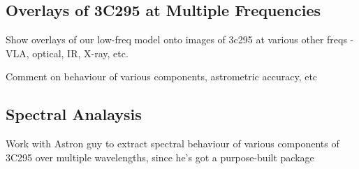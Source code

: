 \subsection{Overlays of 3C295 at Multiple Frequencies}
\pg
Show overlays of our low-freq model onto images of 3c295 at various other freqs - VLA, optical, IR, X-ray, etc.

\pg
Comment on behaviour of various components, astrometric accuracy, etc

\subsection{Spectral Analaysis}

\pg
Work with Astron guy to extract spectral behaviour of various components of 3C295 over multiple wavelengths, since he's got a purpose-built package